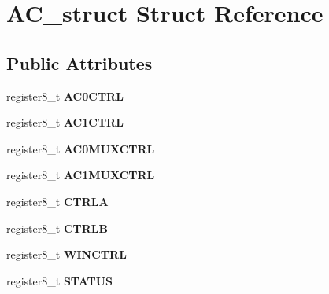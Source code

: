 \hypertarget{struct_a_c__struct}{}\section{A\+C\+\_\+struct Struct Reference}
\label{struct_a_c__struct}
\subsection*{Public Attributes}
\begin{DoxyCompactItemize}
\item 
register8\+\_\+t {\bfseries A\+C0\+C\+T\+RL}\hypertarget{struct_a_c__struct_a735749b8d1bb05682d363f3ac4b3f9a7}{}\label{struct_a_c__struct_a735749b8d1bb05682d363f3ac4b3f9a7}

\item 
register8\+\_\+t {\bfseries A\+C1\+C\+T\+RL}\hypertarget{struct_a_c__struct_a87a05f04707d487255222f467508dbca}{}\label{struct_a_c__struct_a87a05f04707d487255222f467508dbca}

\item 
register8\+\_\+t {\bfseries A\+C0\+M\+U\+X\+C\+T\+RL}\hypertarget{struct_a_c__struct_a1d590cfc0a8de5ed78d5afe222cadf7e}{}\label{struct_a_c__struct_a1d590cfc0a8de5ed78d5afe222cadf7e}

\item 
register8\+\_\+t {\bfseries A\+C1\+M\+U\+X\+C\+T\+RL}\hypertarget{struct_a_c__struct_a042c0a43ce91331ff012ec6acf5b7b49}{}\label{struct_a_c__struct_a042c0a43ce91331ff012ec6acf5b7b49}

\item 
register8\+\_\+t {\bfseries C\+T\+R\+LA}\hypertarget{struct_a_c__struct_aba3a132516f20876ebabdfec5110dbb2}{}\label{struct_a_c__struct_aba3a132516f20876ebabdfec5110dbb2}

\item 
register8\+\_\+t {\bfseries C\+T\+R\+LB}\hypertarget{struct_a_c__struct_a15795c599244a4e81d354e29cd44c1bb}{}\label{struct_a_c__struct_a15795c599244a4e81d354e29cd44c1bb}

\item 
register8\+\_\+t {\bfseries W\+I\+N\+C\+T\+RL}\hypertarget{struct_a_c__struct_a7cbcb49f6e967b6dd10d42667fd3aef7}{}\label{struct_a_c__struct_a7cbcb49f6e967b6dd10d42667fd3aef7}

\item 
register8\+\_\+t {\bfseries S\+T\+A\+T\+US}\hypertarget{struct_a_c__struct_a151d447d35de8c9678466479ba5f1f4b}{}\label{struct_a_c__struct_a151d447d35de8c9678466479ba5f1f4b}

\end{DoxyCompactItemize}


